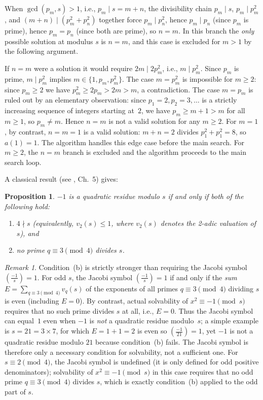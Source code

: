 \documentclass{amsart}
\newtheorem{proposition}[theorem]{Proposition}
\theoremstyle{definition}
\theoremstyle{remark}
\newtheorem{remark}[theorem]{Remark}
\numberwithin{equation}{section}
\begin{document}
When $\gcd(p_m, s) > 1$, i.e., $p_m \mid s = m+n$, the divisibility
chain $p_m \mid s$, $p_m \mid p_m^2$, and $(m+n) \mid (p_m^2 + p_n^2)$
together force $p_m \mid p_n^2$, hence $p_m \mid p_n$ (since $p_m$ is
prime), hence $p_m = p_n$ (since both are prime), so $n = m$.
In this branch the \emph{only} possible solution at modulus $s$ is
$n = m$, and this case is excluded for $m > 1$ by the following
argument.

If $n = m$ were a solution it would require $2m \mid 2p_m^2$,
i.e., $m \mid p_m^2$.
Since $p_m$ is prime, $m \mid p_m^2$ implies $m \in \{1, p_m, p_m^2\}$.
The case $m = p_m^2$ is impossible for $m \geq 2$: since $p_m \geq 2$
we have $p_m^2 \geq 2p_m > 2m > m$, a contradiction.
The case $m = p_m$ is ruled out by an elementary observation: since
$p_1 = 2, p_2 = 3, \ldots$ is a strictly increasing sequence of
integers starting at~$2$, we have $p_m \geq m + 1 > m$ for all
$m \geq 1$, so $p_m \neq m$.
Hence $n = m$ is not a valid solution for any $m \geq 2$.
For $m = 1$, by contrast, $n = m = 1$ is a valid solution: $m + n = 2$
divides $p_1^2 + p_1^2 = 8$, so $a(1) = 1$.
The algorithm handles this edge case before the main search.
For $m \geq 2$, the $n = m$ branch is excluded and the algorithm
proceeds to the main search loop.

A classical result (see \cite{IrelandRosen}, Ch.~5) gives:

\begin{proposition}\label{prop:qr}
	$-1$ is a quadratic residue modulo $s$ if and only if both of the
	following hold:
	\begin{enumerate}
		\item[(a)] $4 \nmid s$ \textup{(}equivalently, $v_2(s) \leq 1$,
		where $v_2(s)$ denotes the 2-adic valuation of $s$\textup{)}, and
		\item[(b)] no prime $q \equiv 3 \pmod{4}$ divides $s$.
	\end{enumerate}
\end{proposition}

\begin{remark}\label{rem:jacobi}
	Condition~(b) is strictly stronger than requiring the Jacobi symbol
	$\left(\frac{-1}{s}\right) = 1$.
	For odd $s$, the Jacobi symbol $\left(\frac{-1}{s}\right) = 1$ if and
	only if the \emph{sum} $E = \sum_{q \equiv 3 \pmod{4}} v_q(s)$ of the
	exponents of all primes $q \equiv 3 \pmod{4}$ dividing $s$ is even
	(including $E = 0$).
	By contrast, actual solvability of $x^2 \equiv -1 \pmod{s}$ requires
	that no such prime divides $s$ at all, i.e., $E = 0$.
	Thus the Jacobi symbol can equal~$1$ even when $-1$ is \emph{not} a
	quadratic residue modulo~$s$; a simple example is $s = 21 = 3 \times 7$,
	for which $E = 1 + 1 = 2$ is even so $\left(\frac{-1}{21}\right) = 1$,
	yet $-1$ is not a quadratic residue modulo $21$ because condition~(b)
	fails.
	The Jacobi symbol is therefore only a necessary condition for
	solvability, not a sufficient one.
	For $s \equiv 2 \pmod{4}$, the Jacobi symbol is undefined (it is only
	defined for odd positive denominators); solvability of
	$x^2 \equiv -1 \pmod{s}$ in this case requires that no odd prime
	$q \equiv 3 \pmod{4}$ divides $s$, which is exactly condition~(b)
	applied to the odd part of $s$.
\end{remark}
\end{document}
